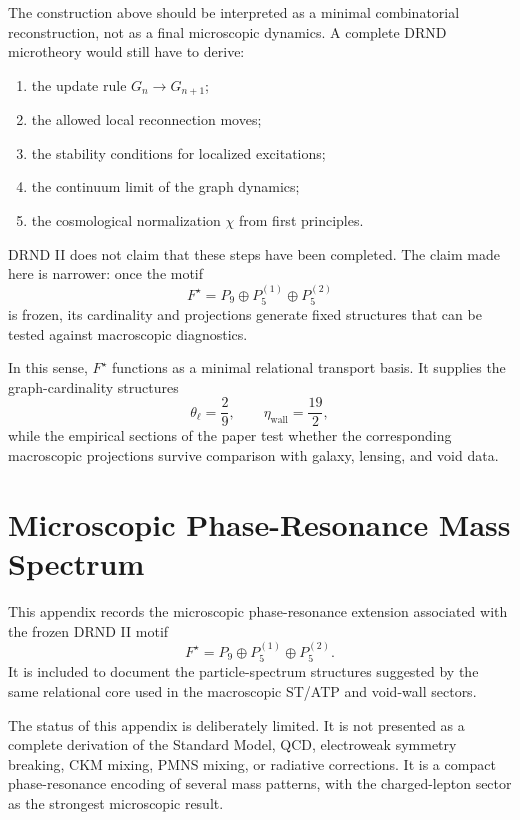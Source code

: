 \documentclass[12pt]{iopart}
\begin{document}
The construction above should be interpreted as a minimal combinatorial reconstruction, not as a final microscopic dynamics. A complete DRND microtheory would still have to derive:
\begin{enumerate}
    \item the update rule \(G_n\to G_{n+1}\);
    \item the allowed local reconnection moves;
    \item the stability conditions for localized excitations;
    \item the continuum limit of the graph dynamics;
    \item the cosmological normalization \(\chi\) from first principles.
\end{enumerate}
DRND II does not claim that these steps have been completed. The claim made here is narrower: once the motif
\begin{equation}
F^\star=P_9\oplus P_5^{(1)}\oplus P_5^{(2)}
\end{equation}
is frozen, its cardinality and projections generate fixed structures that can be tested against macroscopic diagnostics.

In this sense, \(F^\star\) functions as a minimal relational transport basis. It supplies the graph-cardinality structures
\begin{equation}
\theta_\ell=\frac{2}{9},
\qquad
\eta_{\mathrm{wall}}=\frac{19}{2},
\end{equation}
while the empirical sections of the paper test whether the corresponding macroscopic projections survive comparison with galaxy, lensing, and void data.

\section{Microscopic Phase-Resonance Mass Spectrum}
\label{app:mass_spectrum}

This appendix records the microscopic phase-resonance extension associated with the frozen DRND II motif
\begin{equation}
F^\star=P_9\oplus P_5^{(1)}\oplus P_5^{(2)}.
\end{equation}
It is included to document the particle-spectrum structures suggested by the same relational core used in the macroscopic ST/ATP and void-wall sectors.

The status of this appendix is deliberately limited. It is not presented as a complete derivation of the Standard Model, QCD, electroweak symmetry breaking, CKM mixing, PMNS mixing, or radiative corrections. It is a compact phase-resonance encoding of several mass patterns, with the charged-lepton sector as the strongest microscopic result.
\end{document}
